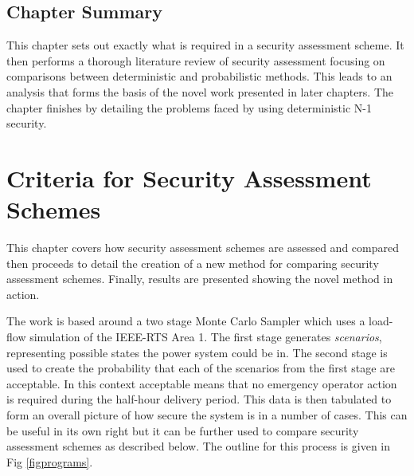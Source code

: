 \documentclass[a4paper,oneside,12pt]{report}
\newcommand{\cmdvivacorrections}[1]
{#1}
\begin{document}
\section{Chapter Summary}

This chapter sets out exactly what is required in a security assessment scheme. It then performs a thorough literature review of security assessment focusing on comparisons between deterministic and probabilistic methods. This leads to an analysis that forms the basis of the novel work presented in later chapters. The chapter finishes by detailing the problems faced by using deterministic N-1 security.







\chapter{\cmdvivacorrections{Criteria for Security Assessment Schemes}}\label{sec_compsas}

This chapter covers how security assessment schemes are assessed and compared then proceeds to detail the creation of a new method for comparing security assessment schemes. Finally, results are presented showing the novel method in action.

The work is based around a two stage Monte Carlo Sampler which uses a load-flow simulation of the IEEE-RTS Area 1. The first stage generates \emph{scenarios}, representing possible states the power system could be in. The second stage is used to create the probability that each of the scenarios from the first stage are acceptable. In this context acceptable means that no emergency operator action is required during the half-hour delivery period. This data is then tabulated to form an overall picture of how secure the system is in a number of cases. This can be useful in its own right but it can be further used to compare security assessment schemes as described below. The outline for this process is given in Fig \ref{figprograms}.
\end{document}
